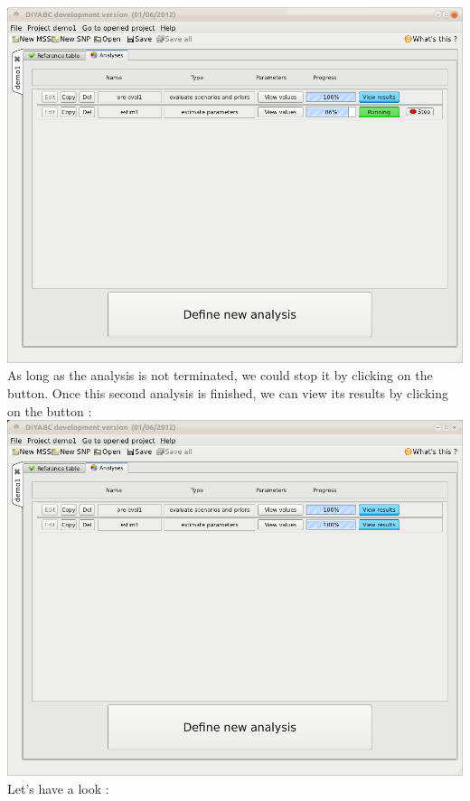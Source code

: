 \includegraphics[scale=0.35]{gui_pictures/Capture-DIYABC-38a.png} \\

As long as the analysis is not terminated, we could stop it by clicking on the   button. Once this second analysis is finished, we can view its results by clicking on the   button :\\

\includegraphics[scale=0.35]{gui_pictures/Capture-DIYABC-39.png} \\

Let's have a look :\\

